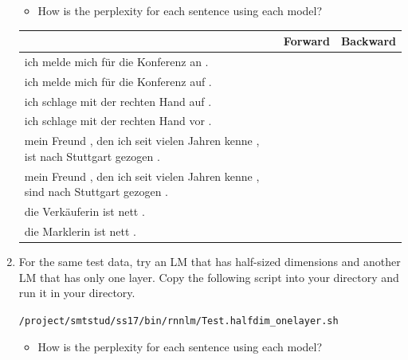 \documentclass[12pt,fleqn]{article}
\begin{document}
\begin{enumerate}
\begin{itemize} 
 \item How is the perplexity for each sentence using each model? 
\end{itemize}


\begin{table}[ht] 
   \begin{center} 
         \begin{tabular}{|p{12cm}|p{1.5cm}|p{1.8cm}|} \hline 
& Forward & Backward \\  \hline 
ich melde mich f\"{u}r die Konferenz an . &  & \\ \hline
ich melde mich f\"{u}r die Konferenz auf . &  & \\  \hline \hline
ich schlage mit der rechten Hand auf . & & \\ \hline
ich schlage mit der rechten Hand vor . & & \\ \hline \hline
mein Freund , den ich seit vielen Jahren kenne , ist nach Stuttgart gezogen . & & \\ \hline
mein Freund , den ich seit vielen Jahren kenne , sind nach Stuttgart gezogen . & & \\ \hline \hline
die Verkäuferin ist nett . & & \\ \hline
die Marklerin ist nett . & & \\ \hline 
         \end{tabular}
   \end{center}
\end{table}

\item For the same test data, try an LM that has half-sized dimensions and another LM that has only one layer. Copy the following script into your directory and run it in your directory.

\texttt{/project/smtstud/ss17/bin/rnnlm/Test.halfdim\_onelayer.sh} 

\begin{itemize} 
 \item How is the perplexity for each sentence using each model? 
\end{itemize}


\end{enumerate}
\end{document}
